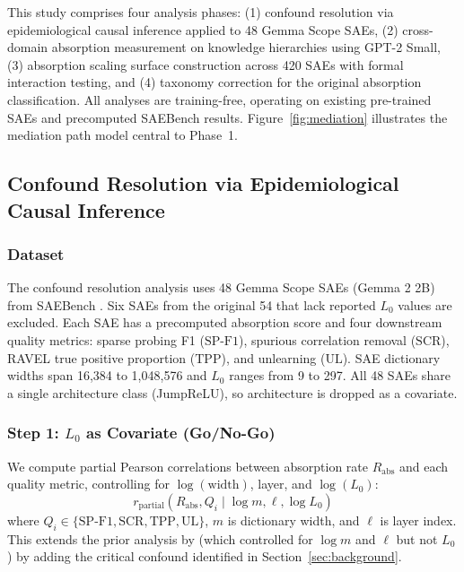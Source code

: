 \documentclass{article}
\begin{document}
This study comprises four analysis phases: (1) confound resolution via epidemiological causal inference applied to 48 Gemma Scope SAEs, (2) cross-domain absorption measurement on knowledge hierarchies using GPT-2 Small, (3) absorption scaling surface construction across 420 SAEs with formal interaction testing, and (4) taxonomy correction for the original absorption classification.
All analyses are training-free, operating on existing pre-trained SAEs and precomputed SAEBench results.
Figure~\ref{fig:mediation} illustrates the mediation path model central to Phase~1.

\subsection{Confound Resolution via Epidemiological Causal Inference}
\label{sec:confound}

\subsubsection{Dataset}

The confound resolution analysis uses 48 Gemma Scope SAEs (Gemma 2 2B) from SAEBench \citep{karvonen2025saebench}.
Six SAEs from the original 54 that lack reported $L_0$ values are excluded.
Each SAE has a precomputed absorption score \citep{chanin2024absorption} and four downstream quality metrics: sparse probing F1 ($\text{SP-F1}$), spurious correlation removal ($\text{SCR}$), RAVEL true positive proportion ($\text{TPP}$), and unlearning ($\text{UL}$).
SAE dictionary widths span 16,384 to 1,048,576 and $L_0$ ranges from 9 to 297.
All 48 SAEs share a single architecture class (JumpReLU), so architecture is dropped as a covariate.

\subsubsection{Step 1: $L_0$ as Covariate (Go/No-Go)}

We compute partial Pearson correlations between absorption rate $R_{\text{abs}}$ and each quality metric, controlling for $\log(\text{width})$, layer, and $\log(L_0)$:
\[
r_{\text{partial}}(R_{\text{abs}}, Q_i \mid \log m, \ell, \log L_0)
\]
where $Q_i \in \{\text{SP-F1}, \text{SCR}, \text{TPP}, \text{UL}\}$, $m$ is dictionary width, and $\ell$ is layer index.
This extends the prior analysis by \citet{chanin2024absorption} (which controlled for $\log m$ and $\ell$ but not $L_0$) by adding the critical confound identified in Section~\ref{sec:background}.
\end{document}
